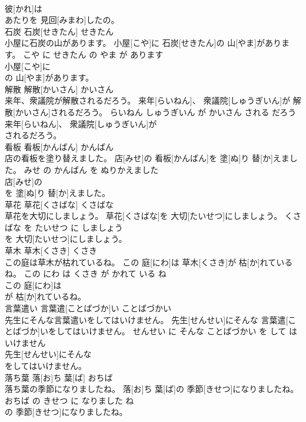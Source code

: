\documentclass[8pt]{extreport}
\begin{document}
\begin{CJK}{UTF8}{min}
\\	彼[かれ]は
\\	あたりを 見回[みまわ]したの。			
\\	石炭	石炭[せきたん]	せきたん	
\\	小屋に石炭の山があります。	小屋[こや]に 石炭[せきたん]の 山[やま]があります。	こや に せきたん の やま が あります	
\\	小屋[こや]に
\\	の 山[やま]があります。			
\\	解散	解散[かいさん]	かいさん	
\\	来年、衆議院が解散されるだろう。	来年[らいねん]、 衆議院[しゅうぎいん]が 解散[かいさん]されるだろう。	らいねん しゅうぎいん が かいさん される だろう	
\\	来年[らいねん]、 衆議院[しゅうぎいん]が
\\	されるだろう。			
\\	看板	看板[かんばん]	かんばん	
\\	店の看板を塗り替えました。	店[みせ]の 看板[かんばん]を 塗[ぬ]り 替[か]えました。	みせ の かんばん を ぬりかえました	
\\	店[みせ]の
\\	を 塗[ぬ]り 替[か]えました。			
\\	草花	草花[くさばな]	くさばな	
\\	草花を大切にしましょう。	草花[くさばな]を 大切[たいせつ]にしましょう。	くさばな を たいせつ に しましょう	
\\	を 大切[たいせつ]にしましょう。			
\\	草木	草木[くさき]	くさき	
\\	この庭は草木が枯れているね。	この 庭[にわ]は 草木[くさき]が 枯[か]れているね。	この にわ は くさき が かれて いる ね	
\\	この 庭[にわ]は
\\	が 枯[か]れているね。			
\\	言葉遣い	言葉遣[ことばづか]い	ことばづかい	
\\	先生にそんな言葉遣いをしてはいけません。	先生[せんせい]にそんな 言葉遣[ことばづか]いをしてはいけません。	せんせい に そんな ことばづかい を して は いけません	
\\	先生[せんせい]にそんな
\\	をしてはいけません。			
\\	落ち葉	落[お]ち 葉[ば]	おちば	
\\	落ち葉の季節になりましたね。	落[お]ち 葉[ば]の 季節[きせつ]になりましたね。	おちば の きせつ に なりました ね	
\\	の 季節[きせつ]になりましたね。			

\end{CJK}
\end{document}
